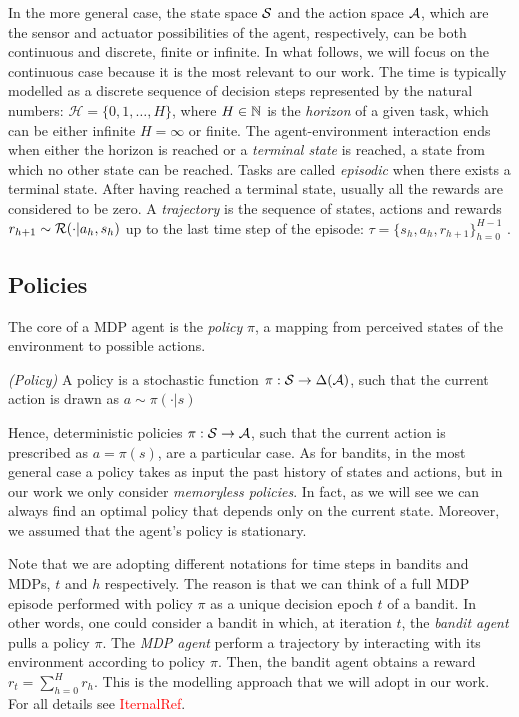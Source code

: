 In the more general case, the state space $\mathcal{S}$ and the action space $\mathcal{A}$, which are the sensor and actuator possibilities of the agent, respectively, can be both continuous and discrete, finite or infinite. In what follows, we will focus on the continuous case because it is the most relevant to our work. The time is typically modelled as a discrete sequence of decision steps represented by the natural numbers: $\mathcal{H} = \{0, 1, \dots, H\}$, where $H\in\mathbb{N}$ is the \emph{horizon} of a given task, which can be either infinite $H = \infty$ or finite. The agent-environment interaction ends when either the horizon is reached or a \emph{terminal state} is reached, \ie a state from which no other state can be reached. Tasks are called \emph{episodic} when there exists a terminal state. After having reached a terminal state, usually all the rewards are considered to be zero. A \emph{trajectory} is the sequence of states, actions and rewards $r_{h+1}\sim\mathcal{R}(\cdot|a_h, s_h)$ up to the last time step of the episode: $\tau=\{s_h,a_h,r_{h+1}\}_{h=0}^{H-1}$ . \\

\subsection{Policies}
The core of a \gls{MDP} agent is the \emph{policy} $\pi$, a mapping from perceived states of the environment to possible actions. 

\begin{definition} \emph{(Policy)}
A policy is a stochastic function $\pi:\mathcal{S}\to\Delta(\mathcal{A})$, such that the current action is drawn as $a\sim\pi(\cdot|s)$
\end{definition}

Hence, deterministic policies $\pi:\mathcal{S}\to\mathcal{A}$, such that the current action is prescribed as $a=\pi(s)$, are a particular case. As for bandits, in the most general case a policy takes as input the past history of states and actions, but in our work we only consider \emph{memoryless policies}. In fact, as we will see we can always find an optimal policy that depends only on the current state. Moreover, we assumed that the agent's policy is stationary.

\begin{remark}
Note that we are adopting different notations for time steps in bandits and \gls{MDP}s, $t$ and $h$ respectively. The reason is that we can think of a full \gls{MDP} episode  performed with policy $\pi$ as a unique decision epoch $t$ of a bandit. In other words, one could consider a bandit in which, at iteration $t$, the \emph{bandit agent} pulls a policy $\pi$. The \emph{\gls{MDP} agent} perform a trajectory by interacting with its environment according to policy $\pi$. Then, the bandit agent obtains a reward $r_t=\sum_{h=0}^{H}r_h$. This is the modelling approach that we will adopt in our work. For all details see \textcolor{red}{IternalRef}.
\end{remark}

